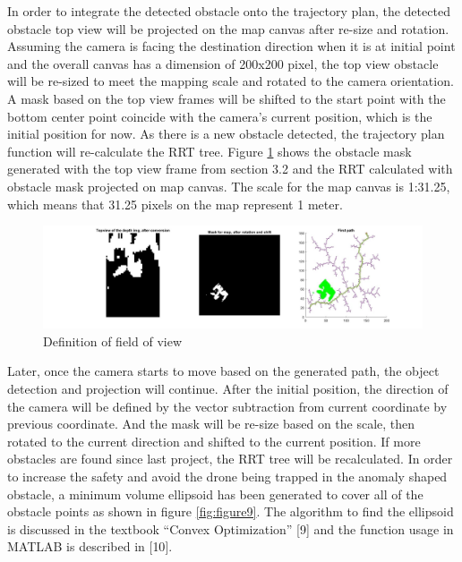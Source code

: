 \documentclass[
  oneside]{ubcthesis}
\begin{document}
In order to integrate the detected obstacle onto the trajectory plan, the detected obstacle top view will be projected on the map canvas after re-size and rotation. Assuming the camera is facing the destination direction when it is at initial point and the overall canvas has a dimension of 200x200 pixel, the top view obstacle will be re-sized to meet the mapping scale and rotated to the camera orientation. A mask based on the top view frames will be shifted to the start point with the bottom center point coincide with the camera's current position, which is the initial position for now. As there is a new obstacle detected, the trajectory plan function will re-calculate the RRT tree. Figure \ref{fig:figure8} shows the obstacle mask generated with the top view frame from section 3.2 and the RRT calculated with obstacle mask projected on map canvas. The scale for the map canvas is 1:31.25, which means that 31.25 pixels on the map represent 1 meter.

\begin{figure}

{\centering \includegraphics[width=0.9\linewidth]{figures/8} 

}

\caption{Definition of field of view}\label{fig:figure8}
\end{figure}



Later, once the camera starts to move based on the generated path, the object detection and projection will continue. After the initial position, the direction of the camera will be defined by the vector subtraction from current coordinate by previous coordinate. And the mask will be re-size based on the scale, then rotated to the current direction and shifted to the current position. If more obstacles are found since last project, the RRT tree will be recalculated.
In order to increase the safety and avoid the drone being trapped in the anomaly shaped obstacle, a minimum volume ellipsoid has been generated to cover all of the obstacle points as shown in figure \ref{fig:figure9}. The algorithm to find the ellipsoid is discussed in the textbook ``Convex Optimization'' {[}9{]} and the function usage in MATLAB is described in {[}10{]}.
\end{document}
